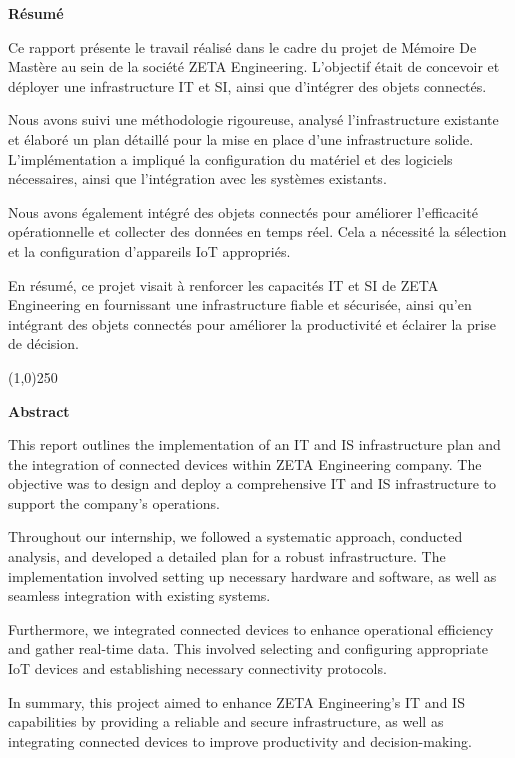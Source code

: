 \textbf{Résumé}

Ce rapport présente le travail réalisé dans le cadre du projet de Mémoire De Mastère au sein de la société ZETA Engineering. L'objectif était de concevoir et déployer une infrastructure IT et SI, ainsi que d'intégrer des objets connectés.

Nous avons suivi une méthodologie rigoureuse, analysé l'infrastructure existante et élaboré un plan détaillé pour la mise en place d'une infrastructure solide. L'implémentation a impliqué la configuration du matériel et des logiciels nécessaires, ainsi que l'intégration avec les systèmes existants.

Nous avons également intégré des objets connectés pour améliorer l'efficacité opérationnelle et collecter des données en temps réel. Cela a nécessité la sélection et la configuration d'appareils IoT appropriés.

En résumé, ce projet visait à renforcer les capacités IT et SI de ZETA Engineering en fournissant une infrastructure fiable et sécurisée, ainsi qu'en intégrant des objets connectés pour améliorer la productivité et éclairer la prise de décision.

\begin{center}
\line(1,0){250}
\end{center}

\textbf{Abstract}

This report outlines the implementation of an IT and IS infrastructure plan and the integration of connected devices within ZETA Engineering company. The objective was to design and deploy a comprehensive IT and IS infrastructure to support the company's operations.

Throughout our internship, we followed a systematic approach, conducted analysis, and developed a detailed plan for a robust infrastructure. The implementation involved setting up necessary hardware and software, as well as seamless integration with existing systems.

Furthermore, we integrated connected devices to enhance operational efficiency and gather real-time data. This involved selecting and configuring appropriate IoT devices and establishing necessary connectivity protocols.

In summary, this project aimed to enhance ZETA Engineering's IT and IS capabilities by providing a reliable and secure infrastructure, as well as integrating connected devices to improve productivity and decision-making.

